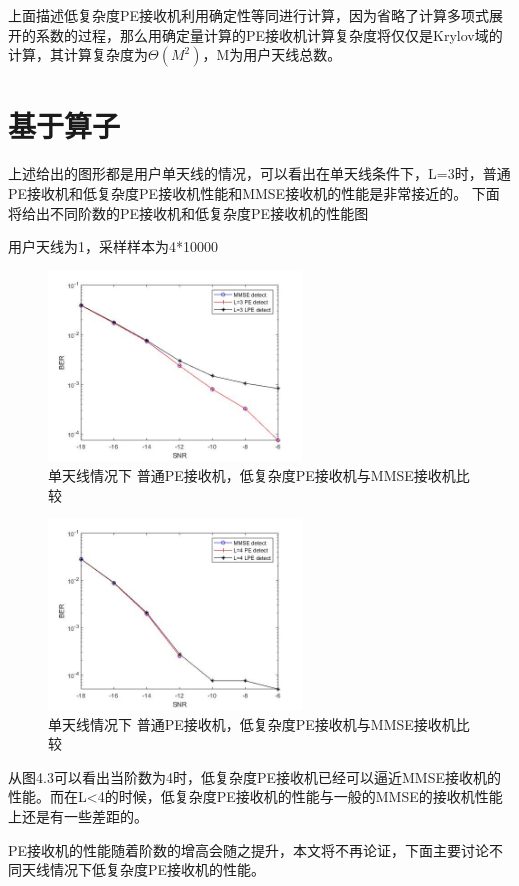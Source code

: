 \documentclass[bachelor,nocolorlinks, printoneside]{seuthesis} %
\begin{document}
\begin{Main}
上面描述低复杂度PE接收机利用确定性等同进行计算，因为省略了计算多项式展开的系数的过程，那么用确定量计算的PE接收机计算复杂度将仅仅是Krylov域的计算，其计算复杂度为$\Theta(M^2)$，M为用户天线总数。

\section{基于算子}
上述给出的图形都是用户单天线的情况，可以看出在单天线条件下，L=3时，普通PE接收机和低复杂度PE接收机性能和MMSE接收机的性能是非常接近的。
下面将给出不同阶数的PE接收机和低复杂度PE接收机的性能图

用户天线为1，采样样本为4*10000
\begin{figure}[htbp!]
	\centering \includegraphics[width=0.6\textwidth]{img/3_5.jpg} \caption{单天线情况下 普通PE接收机，低复杂度PE接收机与MMSE接收机比较}
\end{figure}

\begin{figure}[htbp!]
	\centering \includegraphics[width=0.6\textwidth]{img/3_7.jpg} \caption{单天线情况下 普通PE接收机，低复杂度PE接收机与MMSE接收机比较}
\end{figure}
从图4.3可以看出当阶数为4时，低复杂度PE接收机已经可以逼近MMSE接收机的性能。而在L<4的时候，低复杂度PE接收机的性能与一般的MMSE的接收机性能上还是有一些差距的。

PE接收机的性能随着阶数的增高会随之提升，本文将不再论证，下面主要讨论不同天线情况下低复杂度PE接收机的性能。




\end{Main} %



%



\newpage
\printindex %



%
%

 
\end{document}
